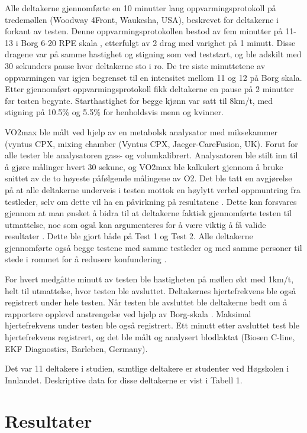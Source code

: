 \documentclass[
]{book}
\begin{document}
Alle deltakerne gjennomførte en 10 minutter lang oppvarmingsprotokoll på tredemøllen (Woodway 4Front, Waukesha, USA), beskrevet for deltakerne i forkant av testen. Denne oppvarmingsprotokollen bestod av fem minutter på 11-13 i Borg 6-20 RPE skala \citep{borg1982}, etterfulgt av 2 drag med varighet på 1 minutt. Disse dragene var på samme hastighet og stigning som ved teststart, og ble adskilt med 30 sekunders pause hvor deltakerne sto i ro. De tre siste minuttetene av oppvarmingen var igjen begrenset til en intensitet mellom 11 og 12 på Borg skala. Etter gjennomført oppvarmingsprotokoll fikk deltakerne en pause på 2 minutter før testen begynte. Starthastighet for begge kjønn var satt til 8km/t, med stigning på 10.5\% og 5.5\% for henholdsvis menn og kvinner.

VO2max ble målt ved hjelp av en metabolsk analysator med miksekammer (vyntus CPX, mixing chamber (Vyntus CPX, Jaeger-CareFusion, UK). Forut for alle tester ble analysatoren gass- og volumkalibrert. Analysatoren ble stilt inn til å gjøre målinger hvert 30 sekunc, og VO2max ble kalkulert gjennom å bruke snittet av de to høyeste påfølgende målingene av O2. Det ble tatt en avgjørelse på at alle deltakerne underveis i testen mottok en høylytt verbal oppmuntring fra testleder, selv om dette vil ha en påvirkning på resultatene \citep{halperin2015}. Dette kan forsvares gjennom at man ønsket å bidra til at deltakerne faktisk gjennomførte testen til utmattelse, noe som også kan argumenteres for å være viktig å få valide resultater \citep[\citet{tønnessen2017}]{halperin2015}. Dette ble gjort både på Test 1 og Test 2. Alle deltakerne gjennomførte også begge testene med samme testleder og med samme personer til stede i rommet for å redusere konfundering \citep{halperin2015}.

For hvert medgåtte minutt av testen ble hastigheten på møllen økt med 1km/t, helt til utmattelse, hvor testen ble avsluttet. Deltakernes hjertefrekvens ble også registrert under hele testen. Når testen ble avsluttet ble deltakerne bedt om å rapportere opplevd anstrengelse ved hjelp av Borg-skala \citep{borg1982}. Maksimal hjertefrekvens under testen ble også registrert. Ett minutt etter avsluttet test ble hjertefrekvens registrert, og det ble målt og analysert blodlaktat (Biosen C-line, EKF Diagnostics, Barleben, Germany).

Det var 11 deltakere i studien, samtlige deltakere er studenter ved Høgskolen i Innlandet. Deskriptive data for disse deltakerne er vist i Tabell 1.

\hypertarget{resultater}{%
\section{Resultater}\label{resultater}}
\end{document}
